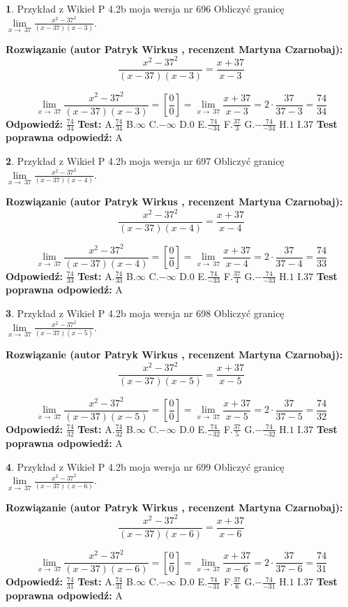 \documentclass[12pt, a4paper]{article}
\theoremstyle{definition} %
\newtheorem{zad}{}
\newcommand{\zadStart}[1]{\begin{zad}#1\newline}
\newcommand{\zadStop}{\end{zad}}
\newcommand{\rozwStart}[2]{\noindent \textbf{Rozwiązanie (autor #1 , recenzent #2): }\newline}
\newcommand{\rozwStop}{\newline}
\newcommand{\odpStart}{\noindent \textbf{Odpowiedź:}\newline}
\newcommand{\odpStop}{\newline}
\newcommand{\testStart}{\noindent \textbf{Test:}\newline}
\newcommand{\testStop}{\newline}
\newcommand{\kluczStart}{\noindent \textbf{Test poprawna odpowiedź:}\newline}
\newcommand{\kluczStop}{\newline}
\begin{document}
\zadStart{Przykład z Wikieł P 4.2b moja wersja nr 696}
Obliczyć granicę $\lim\limits_{x\to\ 37}\frac{x^{2}-37^{2}}{(x-37)(x-3)}$.
\zadStop
\rozwStart{Patryk Wirkus}{Martyna Czarnobaj}
$$\frac{x^{2}-37^{2}}{(x-37)(x-3)}=\frac{x+37}{x-3}$$

$$\lim\limits_{x\to\ 37}\frac{x^{2}-37^{2}}{(x-37)(x-3)}=[\frac{0}{0}]=\lim\limits_{x\to\ 37}\frac{x+37}{x-3}=2 \cdot \frac{37}{37-3} = \frac{74}{34}$$
\rozwStop
\odpStart
$\frac{74}{34}$
\odpStop
\testStart
A.$\frac{74}{34}$
B.$\infty$
C.$-\infty$
D.$0$
E.$\frac{74}{-34}$
F.$\frac{37}{3}$
G.$-\frac{74}{-34}$
H.$1$
I.$37$
\testStop
\kluczStart
A
\kluczStop



\zadStart{Przykład z Wikieł P 4.2b moja wersja nr 697}
Obliczyć granicę $\lim\limits_{x\to\ 37}\frac{x^{2}-37^{2}}{(x-37)(x-4)}$.
\zadStop
\rozwStart{Patryk Wirkus}{Martyna Czarnobaj}
$$\frac{x^{2}-37^{2}}{(x-37)(x-4)}=\frac{x+37}{x-4}$$

$$\lim\limits_{x\to\ 37}\frac{x^{2}-37^{2}}{(x-37)(x-4)}=[\frac{0}{0}]=\lim\limits_{x\to\ 37}\frac{x+37}{x-4}=2 \cdot \frac{37}{37-4} = \frac{74}{33}$$
\rozwStop
\odpStart
$\frac{74}{33}$
\odpStop
\testStart
A.$\frac{74}{33}$
B.$\infty$
C.$-\infty$
D.$0$
E.$\frac{74}{-33}$
F.$\frac{37}{4}$
G.$-\frac{74}{-33}$
H.$1$
I.$37$
\testStop
\kluczStart
A
\kluczStop



\zadStart{Przykład z Wikieł P 4.2b moja wersja nr 698}
Obliczyć granicę $\lim\limits_{x\to\ 37}\frac{x^{2}-37^{2}}{(x-37)(x-5)}$.
\zadStop
\rozwStart{Patryk Wirkus}{Martyna Czarnobaj}
$$\frac{x^{2}-37^{2}}{(x-37)(x-5)}=\frac{x+37}{x-5}$$

$$\lim\limits_{x\to\ 37}\frac{x^{2}-37^{2}}{(x-37)(x-5)}=[\frac{0}{0}]=\lim\limits_{x\to\ 37}\frac{x+37}{x-5}=2 \cdot \frac{37}{37-5} = \frac{74}{32}$$
\rozwStop
\odpStart
$\frac{74}{32}$
\odpStop
\testStart
A.$\frac{74}{32}$
B.$\infty$
C.$-\infty$
D.$0$
E.$\frac{74}{-32}$
F.$\frac{37}{5}$
G.$-\frac{74}{-32}$
H.$1$
I.$37$
\testStop
\kluczStart
A
\kluczStop



\zadStart{Przykład z Wikieł P 4.2b moja wersja nr 699}
Obliczyć granicę $\lim\limits_{x\to\ 37}\frac{x^{2}-37^{2}}{(x-37)(x-6)}$.
\zadStop
\rozwStart{Patryk Wirkus}{Martyna Czarnobaj}
$$\frac{x^{2}-37^{2}}{(x-37)(x-6)}=\frac{x+37}{x-6}$$

$$\lim\limits_{x\to\ 37}\frac{x^{2}-37^{2}}{(x-37)(x-6)}=[\frac{0}{0}]=\lim\limits_{x\to\ 37}\frac{x+37}{x-6}=2 \cdot \frac{37}{37-6} = \frac{74}{31}$$
\rozwStop
\odpStart
$\frac{74}{31}$
\odpStop
\testStart
A.$\frac{74}{31}$
B.$\infty$
C.$-\infty$
D.$0$
E.$\frac{74}{-31}$
F.$\frac{37}{6}$
G.$-\frac{74}{-31}$
H.$1$
I.$37$
\testStop
\kluczStart
A
\kluczStop
\end{document}
